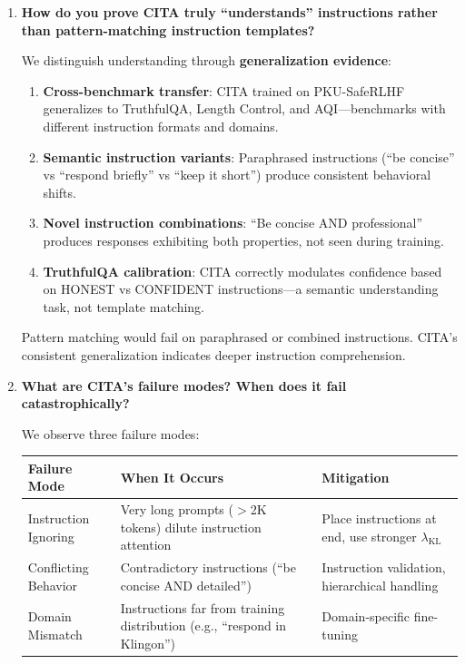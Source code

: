 \begin{enumerate}[label=\textbf{Q\arabic*.}, leftmargin=*, itemsep=8pt]
\vspace{4mm}

\item \textbf{How do you prove CITA truly ``understands'' instructions rather than pattern-matching instruction templates?}

 We distinguish understanding through \textbf{generalization evidence}:

\begin{enumerate}[leftmargin=*,itemsep=2pt]
    \item \textbf{Cross-benchmark transfer}: CITA trained on PKU-SafeRLHF generalizes to TruthfulQA, Length Control, and AQI---benchmarks with different instruction formats and domains.

    \item \textbf{Semantic instruction variants}: Paraphrased instructions (``be concise'' vs ``respond briefly'' vs ``keep it short'') produce consistent behavioral shifts.

    \item \textbf{Novel instruction combinations}: ``Be concise AND professional'' produces responses exhibiting both properties, not seen during training.

    \item \textbf{TruthfulQA calibration}: CITA correctly modulates confidence based on HONEST vs CONFIDENT instructions---a semantic understanding task, not template matching.
\end{enumerate}

Pattern matching would fail on paraphrased or combined instructions. CITA's consistent generalization indicates deeper instruction comprehension.

\vspace{4mm}

\item \textbf{What are CITA's failure modes? When does it fail catastrophically?}

 We observe three failure modes:

\begin{table}[H]
\centering
\small
\renewcommand{\arraystretch}{1.2}
\begin{tabular}{@{}l>{\raggedright\arraybackslash}p{5cm}>{\raggedright\arraybackslash}p{5cm}@{}}
\toprule
\textbf{Failure Mode} & \textbf{When It Occurs} & \textbf{Mitigation} \\
\midrule
Instruction Ignoring & Very long prompts ($>$2K tokens) dilute instruction attention & Place instructions at end, use stronger $\lambda_{\text{KL}}$ \\ \hline
Conflicting Behavior & Contradictory instructions (``be concise AND detailed'') & Instruction validation, hierarchical handling \\ \hline
Domain Mismatch & Instructions far from training distribution (e.g., ``respond in Klingon'') & Domain-specific fine-tuning \\
\bottomrule
\end{tabular}
\end{table}


\end{enumerate}
